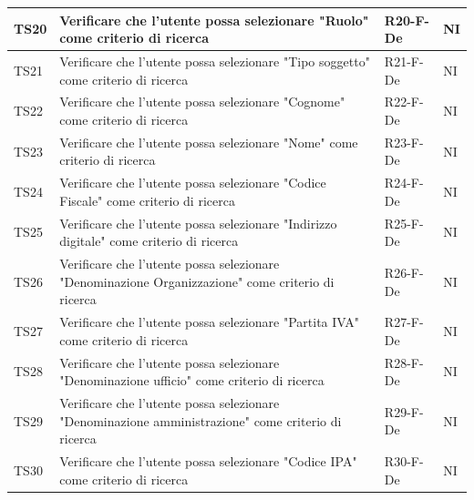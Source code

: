\documentclass[a4paper,12pt]{article}
\begin{document}
\begin{longtable}{|M{1.2cm}|M{6.3cm}|M{2.5cm}|M{1.5cm}|}
                TS20 & Verificare che l'utente possa selezionare "Ruolo" come criterio di ricerca & R20-F-De & NI \\
                \hline
                
                TS21 & Verificare che l'utente possa selezionare "Tipo soggetto" come criterio di ricerca & R21-F-De & NI \\
                \hline
                
                TS22 & Verificare che l'utente possa selezionare "Cognome" come criterio di ricerca & R22-F-De & NI \\
                \hline
                
                TS23 & Verificare che l'utente possa selezionare "Nome" come criterio di ricerca & R23-F-De & NI \\
                \hline
                
                TS24 & Verificare che l'utente possa selezionare "Codice Fiscale" come criterio di ricerca & R24-F-De & NI \\
                \hline
                
                TS25 & Verificare che l'utente possa selezionare "Indirizzo digitale" come criterio di ricerca & R25-F-De & NI \\
                \hline
                
                TS26 & Verificare che l'utente possa selezionare "Denominazione Organizzazione" come criterio di ricerca & R26-F-De & NI \\
                \hline
                
                TS27 & Verificare che l'utente possa selezionare "Partita IVA" come criterio di ricerca & R27-F-De & NI \\
                \hline

                TS28 & Verificare che l'utente possa selezionare "Denominazione ufficio" come criterio di ricerca & R28-F-De & NI \\
                \hline
                
                TS29 & Verificare che l'utente possa selezionare "Denominazione amministrazione" come criterio di ricerca & R29-F-De & NI \\
                \hline

                TS30 & Verificare che l'utente possa selezionare "Codice IPA" come criterio di ricerca & R30-F-De & NI \\
                \hline


\end{longtable}
\end{document}
